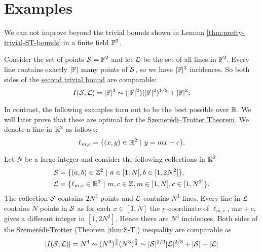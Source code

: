 \section{Examples}
We can not improve beyond the trivial bounds shown in Lemma \ref{thm:pretty-trivial-ST-bounds} in a finite field $\mathbb F^2$. 
\begin{example}
Consider the set of points $\mathcal S=\mathbb F^2$ and let $\mathcal L$ be the set of all lines 
in $\mathbb F^2$. Every line contains exactly $|\mathbb F|$ many points of $\mathcal S$, so we have $|\mathbb F|^3$ incidences. 
So both sides of the \hyperref[thm:pretty-trivial-ST-bounds]{second trivial bound} are comparable:
$$
I(\mathcal S,\mathcal L) = |\mathbb F|^3 \sim (|\mathbb F|^2)(|\mathbb F|^2)^{1/2} + |\mathbb F|^2.
$$
\end{example}
In contrast, the following examples turn out to be the best possible over $\mathbb R$. We will later prove that these are optimal for the \hyperref[thm:S-T]{Szemerédi–Trotter Theorem}.
We denote a line in $\mathbb R^2$ as follows:
\[
    \ell_{m,c} = \{(x,y) \in \mathbb R^2 \ | \ y = mx+c\}.     
\]
\begin{example}
    Let $N$ be a large integer and consider the following collections in $\mathbb R^2$
    \begin{align*}
    \mathcal S &= \{ (a,b) \in \mathbb Z^2 \ | \ a\in [1,N], b \in [1,2N^2] \}, \\
    \mathcal L &= \{ \ell_{m,c} \in \mathbb R^2 \ | \ m,c\in \mathbb Z, m\in [1,N], c \in [1,N^2] \}. \end{align*}
    The collection $\mathcal S$ contains $2N^3$ points and $\mathcal L$ contains $N^3$ lines. Every line in $\mathcal L$ contains $N$ points in $\mathcal S$ as for each $x \in [1,N]$  the y-coordinate of $\ell_{m,c}$, $ mx+c$, gives a different integer in $[1,2N^2]$.
    Hence there are $N^4$ incidences. Both sides of the \hyperref[thm:S-T]{Szemerédi-Trotter} (Theorem \ref{thm:S-T}) inequality are comparable as 
    $$ |I(\mathcal S,\mathcal L)| = N^4 \sim (N^3)^{\frac{2}{3}} (N^3)^{\frac{2}{3}} \sim |\mathcal S|^{2/3} |\mathcal L|^{2/3} + |\mathcal S| + |\mathcal L|$$
\end{example}
